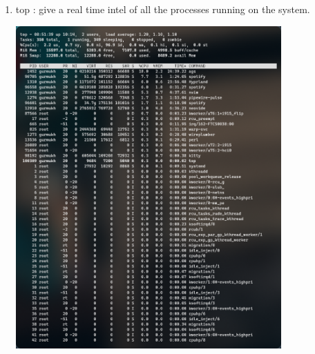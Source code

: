 \documentclass[12pt,letterpaper]{article}
\begin{document}
\begin{enumerate}
\begin{enumerate}
\begin{center}
        \end{center}
      \item top : give a real time intel of all the processes running on the system. 
        \begin{center}
          \includegraphics[width=0.8\textwidth]{screens/Pasted image (14).png}
        \end{center}
    \end{enumerate}
\end{enumerate}
\end{document}
